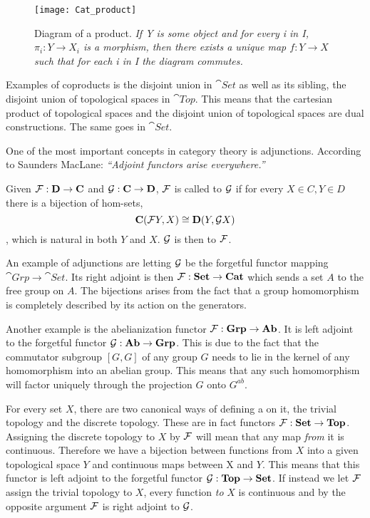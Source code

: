 \documentclass[../../main.tex]{subfiles}
\begin{document}
    \begin{figure}[h]
        \centering
        \texttt{[image: Cat\_product]}
        \caption{Diagram of a product. \textit{If Y is some object and for every i in I, $\pi_i:Y\to X_i$ is a morphism, then there exists a unique map $f:Y\to X$ such that for each i in I the diagram commutes.}}
        \label{fig:product}
    \end{figure}

    Examples of coproducts is the disjoint union in $\cat{Set}$ as well as its sibling, the disjoint union of topological spaces in $\cat{Top}$. This means that the cartesian product of topological spaces and the disjoint union of topological spaces are dual constructions. The same goes in $\cat{Set}$.
    
    One of the most important concepts in category theory is adjunctions. According to Saunders MacLane: \textit{“Adjoint functors arise everywhere.”}
    
    \begin{definition}
        Given $\mathcal{F}: \mathbf{D} \to \mathbf{C}$ and $\mathcal{G}: \mathbf{C} \to \mathbf{D}$, $\mathcal{F}$ is called  to $\mathcal{G}$ if for every $X \in C, Y \in D$ there is a bijection of hom-sets, $$\mathbf{C}(\mathcal{F}Y, X) \cong \mathbf{D}(Y, \mathcal{G}X)$$, which is natural in both $Y$ and $X$. $\mathcal{G}$ is then  to $\mathcal{F}$.
    \end{definition}
    
    An example of adjunctions are letting $\mathcal{G}$ be the forgetful functor mapping $\cat{Grp} \to \cat{Set}$. Its right adjoint is then $\mathcal{F}: \mathbf{Set} \to \mathbf{Cat}$ which sends a set $A$ to the free group on $A$. The bijections arises from the fact that a group homomorphism is completely described by its action on the generators.
    
    Another example is the abelianization functor $\mathcal{F}: \mathbf{Grp} \to \mathbf{Ab}$. It is left adjoint to the forgetful functor $\mathcal{G}: \mathbf{Ab} \to \mathbf{Grp}$. This is due to the fact that the commutator subgroup $[G, G]$ of any group $G$ needs to lie in the kernel of any homomorphism into an abelian group. This means that any such homomorphism will factor uniquely through the projection $G$ onto $G^{ab}$.
    
    For every set $X$, there are two canonical ways of defining a on it, the trivial topology and the discrete topology. These are in fact functors $\mathcal{F}: \mathbf{Set} \to \mathbf{Top}$. Assigning the discrete topology to $X$ by $\mathcal{F}$ will mean that any map \emph{from} it is continuous. Therefore we have a bijection between functions from $X$ into a given topological space $Y$ and continuous maps between X and $Y$. This means that this functor is left adjoint to the forgetful functor $\mathcal{G}: \mathbf{Top} \to \mathbf{Set}$. If instead we let $\mathcal{F}$ assign the trivial topology to $X$, every function \emph{to} $X$ is continuous and by the opposite argument $\mathcal{F}$ is right adjoint to $\mathcal{G}$.
    
\end{document}
